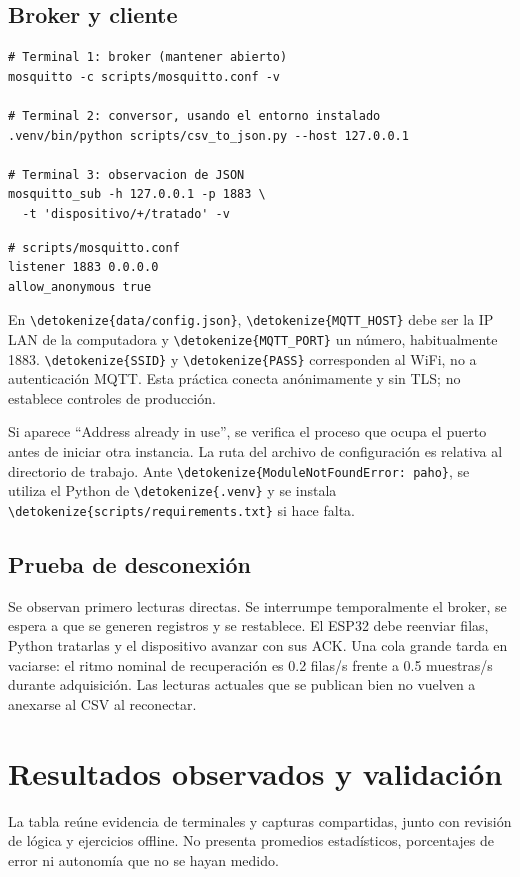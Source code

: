 \documentclass[11pt,a4paper]{article}
\newcommand{\code}[1]{\expandafter\nolinkurl\expandafter{\detokenize{#1}}}
\newcommand{\nextsection}[1]{\clearpage\section{#1}}
\begin{document}
\subsection{Broker y cliente}
\begin{lstlisting}
# Terminal 1: broker (mantener abierto)
mosquitto -c scripts/mosquitto.conf -v

# Terminal 2: conversor, usando el entorno instalado
.venv/bin/python scripts/csv_to_json.py --host 127.0.0.1

# Terminal 3: observacion de JSON
mosquitto_sub -h 127.0.0.1 -p 1883 \
  -t 'dispositivo/+/tratado' -v
\end{lstlisting}
\begin{lstlisting}
# scripts/mosquitto.conf
listener 1883 0.0.0.0
allow_anonymous true
\end{lstlisting}
En \code{data/config.json}, \code{MQTT_HOST} debe ser la IP LAN de la computadora y \code{MQTT_PORT} un número, habitualmente 1883. \code{SSID} y \code{PASS} corresponden al WiFi, no a autenticación MQTT. Esta práctica conecta anónimamente y sin TLS; no establece controles de producción.\cite{mosquitto}

Si aparece ``Address already in use'', se verifica el proceso que ocupa el puerto antes de iniciar otra instancia. La ruta del archivo de configuración es relativa al directorio de trabajo. Ante \code{ModuleNotFoundError: paho}, se utiliza el Python de \code{.venv} y se instala \code{scripts/requirements.txt} si hace falta.

\subsection{Prueba de desconexión}
Se observan primero lecturas directas. Se interrumpe temporalmente el broker, se espera a que se generen registros y se restablece. El ESP32 debe reenviar filas, Python tratarlas y el dispositivo avanzar con sus ACK. Una cola grande tarda en vaciarse: el ritmo nominal de recuperación es 0.2 filas/s frente a 0.5 muestras/s durante adquisición. Las lecturas actuales que se publican bien no vuelven a anexarse al CSV al reconectar.

\nextsection{Resultados observados y validación}
La tabla reúne evidencia de terminales y capturas compartidas, junto con revisión de lógica y ejercicios offline. No presenta promedios estadísticos, porcentajes de error ni autonomía que no se hayan medido.
\end{document}

